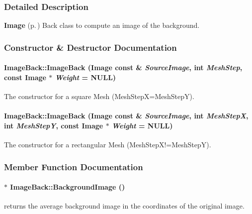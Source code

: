 \subsubsection{Detailed Description}
{\bf Image} {\rm (p.\,\pageref{class_image})} Back class to compute an image of the background.



\subsubsection{Constructor \& Destructor Documentation}
\paragraph{\setlength{\rightskip}{0pt plus 5cm}Image\-Back::Image\-Back ({\bf Image} const \& {\em Source\-Image}, int {\em Mesh\-Step}, const {\bf Image} $\ast$ {\em Weight} = NULL)}\hfill\label{class_imageback_a0}


The constructor for a square Mesh (Mesh\-Step\-X=Mesh\-Step\-Y). 
\paragraph{\setlength{\rightskip}{0pt plus 5cm}Image\-Back::Image\-Back ({\bf Image} const \& {\em Source\-Image}, int {\em Mesh\-Step\-X}, int {\em Mesh\-Step\-Y}, const {\bf Image} $\ast$ {\em Weight} = NULL)}\hfill\label{class_imageback_a1}


The constructor for a rectangular Mesh (Mesh\-Step\-X!=Mesh\-Step\-Y). 

\subsubsection{Member Function Documentation}
\paragraph{ $\ast$ Image\-Back::Background\-Image ()}\hfill\label{class_imageback_a6}


returns the average background image in the coordinates of the original image. 
